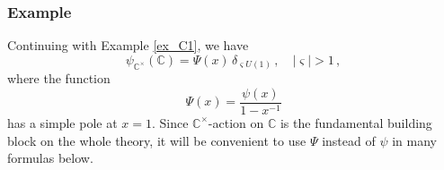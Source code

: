 \documentclass[14pt]{extarticle}
\newcommand{\C}{\mathbb{C}}
\newcommand{\Ct}{\mathbb{C}^\times}
\newcommand{\bG}{\mathsf{G}}
\newcommand{\bX}{\mathsf{X}}
\theoremstyle{definition}
\begin{document}






\subsubsection{Example}\label{ex_C2}

Continuing with Example \ref{ex_C1}, we have
%
\begin{equation}
  \label{eq:45}
  \psi_{\Ct}(\C)  = 
\Psi(x) \, \delta_{\varsigma U(1) }   \,, \quad |\varsigma| > 1 \,, 
\end{equation}
%
where the function 
%
\begin{equation}
  \label{eq:46}
  \Psi(x) = \frac{\psi(x)}{1-x^{-1}}
\end{equation}
%
has a simple pole at $x=1$. Since $\Ct$-action on $\C$ is the
fundamental building block on the whole theory, it will be convenient
to use $\Psi$ instead of $\psi$ in many formulas below.
\end{document}
